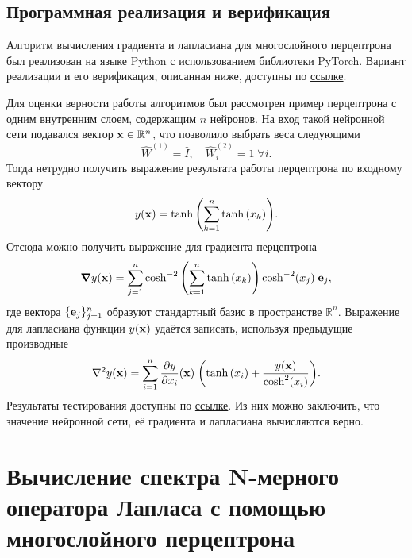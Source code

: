 \documentclass[11pt]{article}
\numberwithin{equation}{section}
\begin{document}
\subsection{Программная реализация и верификация}

Алгоритм вычисления градиента и лапласиана для многослойного перцептрона был реализован на языке Python с использованием библиотеки PyTorch. Вариант реализации и его верификация, описанная ниже, доступны по \href{https://github.com/MrKozelberg/laplacian_perceptron/blob/main/laplacian.ipynb}{ссылке}.

Для оценки верности работы алгоритмов был рассмотрен пример перцептрона с одним внутренним слоем, содержащим $n$ нейронов. На вход такой нейронной сети подавался вектор $\vb{x}\in\mathbb{R}^n$, что позволило выбрать веса следующими
\begin{equation}
 \hat W^{(1)} = \hat I,\quad \hat W^{(2)}_i = 1\; \forall i.
\end{equation}
Тогда нетрудно получить выражение результата работы перцептрона по входному вектору
\begin{equation}
 y(\vb{x}) = \tanh\qty(\sum_{k=1}^n\tanh\qty(x_k)).
\end{equation}
Отсюда можно получить выражение для градиента перцептрона
\begin{equation}
 \grad{y} (\vb{x})= \sum_{j=1}^n \cosh^{-2}\qty(\sum_{k=1}^n\tanh\qty(x_k)) \cosh^{-2}(x_j)\; \vb{e}_j,
\end{equation}
где вектора $\{ \vb{e}_j\}_{j=1}^n$ образуют стандартный базис в пространстве $\mathbb{R}^n$. Выражение для лапласиана функции $y(\vb{x})$ удаётся записать, используя предыдущие производные
\begin{equation}
\begin{split}
 \laplacian{y} (\vb{x}) = \sum_{i=1}^n \pdv{y}{x_i} \qty(\vb{x})\; \qty(\tanh\qty(x_i) + \dfrac{y(\vb{x})}{\cosh^2(x_i)}).
\end{split}
\end{equation}
Результаты тестирования доступны по \href{https://github.com/MrKozelberg/laplacian_perceptron/blob/main/laplacian.ipynb}{ссылке}. Из них можно заключить, что значение нейронной сети, её градиента и лапласиана вычисляются верно.

\section{Вычисление спектра N-мерного оператора Лапласа с помощью многослойного перцептрона}
\end{document}
